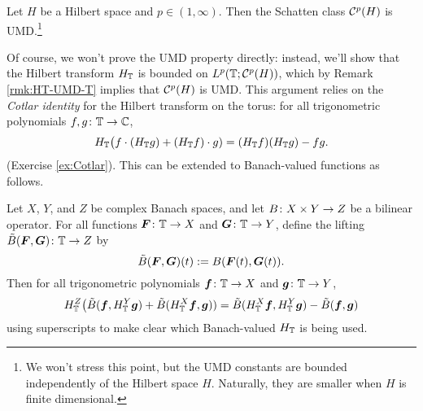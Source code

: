 \begin{thm}\label{thm:Schatten-UMD}
  Let $H$ be a Hilbert space and $p \in (1,\infty)$.
  Then the Schatten class $\mathcal{C}^{p}(H)$ is UMD.\footnote{We won't stress this point, but the UMD constants are bounded independently of the Hilbert space $H$.
  Naturally, they are smaller when $H$ is finite dimensional.}
\end{thm}

Of course, we won't prove the UMD property directly: instead, we'll show that the Hilbert transform $H_{\mathbb{T}}$ is bounded on $L^p(\mathbb{T}; \mathcal{C}^{p}(H))$, which by Remark \ref{rmk:HT-UMD-T} implies that $\mathcal{C}^{p}(H)$ is UMD.
This argument relies on the \emph{Cotlar identity} for the Hilbert transform on the torus: for all trigonometric polynomials $f,g \colon \mathbb{T} \rightarrow \mathbb{C}$,
\begin{equation}\label{eq:Cotlar}
  H_{\mathbb{T}}\big(f \cdot (H_{\mathbb{T}} g) + (H_{\mathbb{T}} f) \cdot g) = (H_{\mathbb{T}} f)(H_{\mathbb{T}} g) - fg.
\end{equation}
(Exercise \ref{ex:Cotlar}).
This can be extended to Banach-valued functions as follows.

\begin{lem}\label{lem:Cotlar-BV}
  Let $X$, $Y$, and $Z$ be complex Banach spaces, and let $B \colon X \times Y \rightarrow Z$ be a bilinear operator.
  For all functions $\bm{F} \colon \mathbb{T} \to X$ and $\bm{G} \colon \mathbb{T} \to Y$, define the lifting $\tilde{B}(\bm{F},\bm{G}) \colon \mathbb{T} \rightarrow Z$ by
  \begin{equation*}
    \tilde{B}(\bm{F},\bm{G})(t) := B(\bm{F}(t), \bm{G}(t)).
  \end{equation*}
  Then for all trigonometric polynomials $\bm{f} \colon \mathbb{T} \rightarrow X$ and $\bm{g} \colon \mathbb{T} \rightarrow Y$,
  \begin{equation*}
    H_{\mathbb{T}}^{Z}\big(\tilde{B}(\bm{f}, H_{\mathbb{T}}^{Y} \bm{g}) + \tilde{B}(H_{\mathbb{T}}^{X} \bm{f}, \bm{g})) = \tilde{B}(H_{\mathbb{T}}^{X} \bm{f}, H_{\mathbb{T}}^{Y} \bm{g}) - \tilde{B}(\bm{f}, \bm{g})
  \end{equation*}
  using superscripts to make clear which Banach-valued $H_{\mathbb{T}}$ is being used.
\end{lem}

